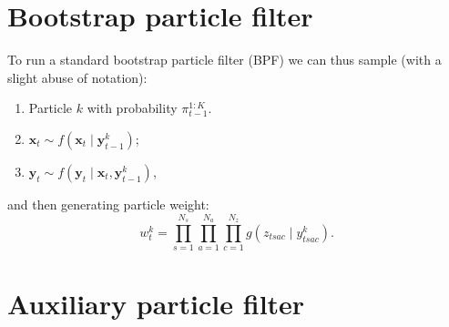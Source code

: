 \documentclass[a4paper]{article}
\newcommand{\bx}{\bm{x}}
\newcommand{\by}{\bm{y}}
\begin{document}
\section{Bootstrap particle filter}

To run a standard bootstrap particle filter (BPF) we can thus sample (with a slight abuse of notation):
\begin{enumerate}
    \item Particle $k$ with probability $\pi^{1:K}_{t - 1}$.
    \item $\bx_t \sim f\left(\bx_t \mid \by^k_{t - 1}\right)$;
    \item $\by_t \sim f\left(\by_t \mid \bx_t, \by^k_{t - 1}\right)$,
\end{enumerate}
and then generating particle weight:
\begin{equation}
    w^k_t = \prod_{s = 1}^{N_s} \prod_{a = 1}^{N_a} \prod_{c = 1}^{N_z} g\left(z_{tsac} \mid y^k_{tsac}\right).
\end{equation}

\section{Auxiliary particle filter}
\end{document}
